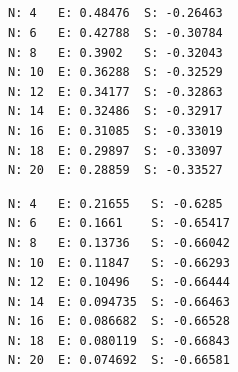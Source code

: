 \documentclass[12pt]{article}
\begin{document}
\subsection{} %

\begin{minipage}{\linewidth}
\begin{lstlisting}
N: 4   E: 0.48476  S: -0.26463
N: 6   E: 0.42788  S: -0.30784
N: 8   E: 0.3902   S: -0.32043
N: 10  E: 0.36288  S: -0.32529
N: 12  E: 0.34177  S: -0.32863
N: 14  E: 0.32486  S: -0.32917
N: 16  E: 0.31085  S: -0.33019
N: 18  E: 0.29897  S: -0.33097
N: 20  E: 0.28859  S: -0.33527
\end{lstlisting}
\end{minipage}

\begin{minipage}{\linewidth}
\begin{lstlisting}
N: 4   E: 0.21655   S: -0.6285
N: 6   E: 0.1661    S: -0.65417
N: 8   E: 0.13736   S: -0.66042
N: 10  E: 0.11847   S: -0.66293
N: 12  E: 0.10496   S: -0.66444
N: 14  E: 0.094735  S: -0.66463
N: 16  E: 0.086682  S: -0.66528
N: 18  E: 0.080119  S: -0.66843
N: 20  E: 0.074692  S: -0.66581
\end{lstlisting}
\end{minipage}

\section{} %

\subsection{} %
\subsection{} %
\end{document}
